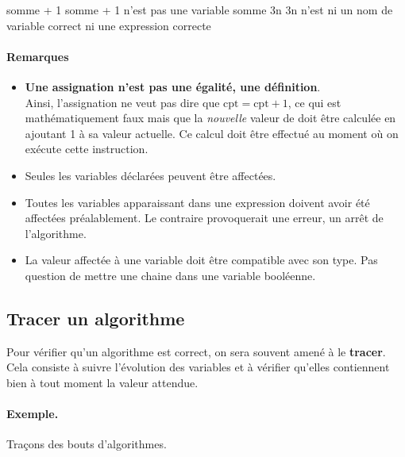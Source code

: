 				\begin{wrong}
					\begin{LDA}
					\Let somme + 1 
					\RComment somme + 1 n’est pas une variable
					\Let somme \Gets 3n
					\RComment 3n n’est ni un nom de variable correct ni une expression correcte
					\end{LDA}
				\end{wrong}
				
			\paragraph{Remarques}
			
				\begin{itemize}
				\item 
					\textbf{Une assignation n’est pas une égalité, une définition}.
					\\Ainsi, l’assignation 
					ne veut pas dire que $\textrm{cpt} = \textrm{cpt} + 1$,
					ce qui est mathématiquement faux 
					mais que la \emph{nouvelle} valeur de 
					doit être calculée en ajoutant 1 à sa valeur actuelle.
					Ce calcul doit être effectué au moment 
					où on exécute cette instruction. 
				\item 
					Seules les variables déclarées peuvent être affectées.
				\item 
					Toutes les variables apparaissant dans une expression
					doivent avoir été affectées préalablement. 
					Le contraire provoquerait une erreur,
					un arrêt de l’algorithme.
				\item 
					La valeur affectée à une variable 
					doit être compatible avec son type.
					Pas question de mettre une chaine dans une variable
					booléenne.
				\end{itemize}
				
		\subsection{Tracer un algorithme}
		
			Pour vérifier qu’un algorithme est correct,
			on sera souvent amené à le \textbf{tracer}.
			Cela consiste à suivre l’évolution des variables
			et à vérifier qu’elles contiennent bien à tout moment
			la valeur attendue.
			
			\paragraph{Exemple.} Traçons des bouts d’algorithmes.
			
